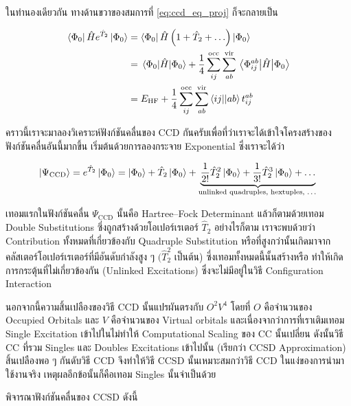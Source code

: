 ในทำนองเดียวกัน ทางด้านขวาของสมการที่ \eqref{eq:ccd_eq_proj} ก็จะกลายเป็น

\begin{equation}
    \begin{split}
        \bra{\Phi_0}\hat{H}e^{\hat{T}_2}\ket{\Phi_0}
        &=
        \bra{\Phi_0}\hat{H}\left(1 + \hat{T}_2 + \ldots\right)\ket{\Phi_0} \\
        &=  \expval{\hat{H}}{\Phi_0}
        + \frac{1}{4} \sum_{ij}^{\mathrm{occ}} \sum_{ab}^{\mathrm{vir}} \mel{\Phi_{ij}^{ab}}{\hat{H}}{\Phi_0} \\
        &= E_{\mathrm{HF}}
        + \frac{1}{4} \sum_{ij}^{\mathrm{occ}} \sum_{ab}^{\mathrm{vir}} \bra{ij}\!\ket{ab} t_{ij}^{ab}
    \end{split}
\end{equation}

คราวนี้เราจะมาลองวิเคราะห์ฟังก์ชันคลื่นของ CCD กันครับเพื่อที่ว่าเราจะได้เข้าใจโครงสร้างของฟังก์ชันคลื่นอันนี้มากขึ้น เริ่มต้นด้วยการลองกระจาย
Exponential ซึ่งเราจะได้ว่า

\begin{equation}
    \ket{\Psi_{\mathrm{CCD}}}
    = e^{\hat{T}_2} \ket{\Phi_0}
    = \ket{\Phi_0} + \hat{T}_2 \ket{\Phi_0}
    + \underbrace{\frac{1}{2!}\hat{T}_2^2\ket{\Phi_0}
        + \frac{1}{3!}\hat{T}_2^3\ket{\Phi_0}
        + \ldots}_{\text{unlinked quadruples, hextuples, \ldots}}
\end{equation}

\noindent เทอมแรกในฟังก์ชันคลื่น $\Psi_{\mathrm{CCD}}$ นั้นคือ Hartree--Fock Determinant แล้วก็ตามด้วยเทอม Double
Substitutions ซึ่งถูกสร้างด้วยโอเปอร์เรเตอร์ $\hat{T}_2$ อย่างไรก็ตาม เราจะพบด้วยว่า Contribution ทั้งหมดที่เกี่ยวข้องกับ Quadruple
Substitution หรือที่สูงกว่านั้นเกิดมาจากคลัสเตอร์โอเปอร์เรเตอร์ที่มีอันดับกำลังสูง ๆ $(\hat{T}_2^2$ เป็นต้น) ซึ่งเทอมทั้งหมดนี้นั้นสร้างหรือ%
ทำให้เกิดการกระตุ้นที่ไม่เกี่ยวข้องกัน (Unlinked Excitations) ซึ่งจะไม่มีอยู่ในวิธี Configuration Interaction

นอกจากนี้ความสิ้นเปลืองของวิธี CCD นั้นแปรผันตรงกับ $O^2V^4$ โดยที่ $O$ คือจำนวนของ Occupied Orbitals และ $V$ คือจำนวนของ
Virtual orbitals และเนื่องจากว่าการที่เราเติมเทอม Single Excitation เข้าไปในไม่ทำให้ Computational Scaling ของ CC นั้นเปลี่ยน
ดังนั้นวิธี CC ที่รวม Singles และ Doubles Excitations เข้าไปนั้น (เรียกว่า CCSD Approximation) สิ้นเปลืองพอ ๆ กันดับวิธี CCD
จึงทำให้วิธี CCSD นั้นเหมาะสมกว่าวิธี CCD ในแง่ของการนำมาใช้งานจริง เหตุผลอีกข้อนั้นก็คือเทอม Singles นั้นจำเป็นด้วย

พิจารณาฟังก์ชันคลื่นของ CCSD ดังนี้

